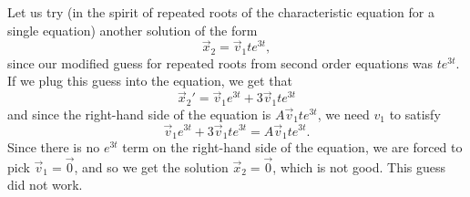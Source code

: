 \begin{example}
Let us try (in the spirit of repeated roots of the
characteristic equation for a single equation) another solution of the form
\begin{equation*}
\vec{x}_2 = \vec{v}_1 te^{3t},
\end{equation*}
since our modified guess for repeated roots from second order equations was $te^{3t}$. If we plug this guess into the equation, we get that
\begin{equation*}
\vec{x}_2' = \vec{v}_1 e^{3t} + 3\vec{v}_1te^{3t}
\end{equation*}
and since the right-hand side of the equation is $A\vec{v}_1te^{3t}$, we need $v_1$ to satisfy
\begin{equation*}
\vec{v}_1 e^{3t} + 3\vec{v}_1te^{3t} = A\vec{v}_1te^{3t}.
\end{equation*}
Since there is no $e^{3t}$ term on the right-hand side of the equation, we are forced to pick $\vec{v}_1 = \vec{0}$, and so  we get the solution $\vec{x}_2 = \vec{0}$, which is not good. This guess did not work.


\end{example}
